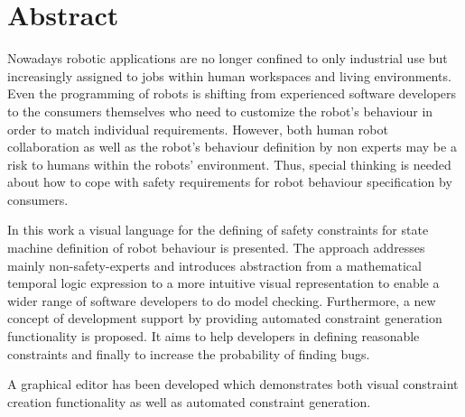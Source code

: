 \chapter*{Abstract}

Nowadays robotic applications are no longer confined to only industrial use but increasingly assigned to jobs within human workspaces and living environments. Even the programming of robots is shifting from experienced software developers to the consumers themselves who need to customize the robot's behaviour in order to match individual requirements.
However, both human robot collaboration as well as the robot's behaviour definition by non experts may be a risk to humans within the robots' environment.
Thus, special thinking is needed about how to cope with safety requirements for robot behaviour specification by consumers.

In this work a visual language for the defining of safety constraints for state machine definition of robot behaviour is presented. The approach addresses mainly non-safety-experts and introduces abstraction from a mathematical temporal logic expression to a more intuitive visual representation to enable a wider range of software developers to do model checking.
Furthermore, a new concept of development support by providing automated constraint generation functionality is proposed. It aims to help developers in defining reasonable constraints and finally to increase the probability of finding bugs.

A graphical editor has been developed which demonstrates both visual constraint creation functionality as well as automated constraint generation.